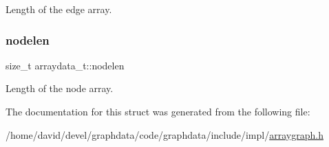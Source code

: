 Length of the edge array. 

\mbox{\label{structarraydata__t_ab7b4b6740dd5353c323233dea2e2eaee}} 
\subsubsection{\texorpdfstring{nodelen}{nodelen}}
{\footnotesize\ttfamily size\+\_\+t arraydata\+\_\+t\+::nodelen}



Length of the node array. 



The documentation for this struct was generated from the following file\+:\begin{DoxyCompactItemize}
\item 
/home/david/devel/graphdata/code/graphdata/include/impl/\hyperlink{arraygraph_8h}{arraygraph.\+h}\end{DoxyCompactItemize}
